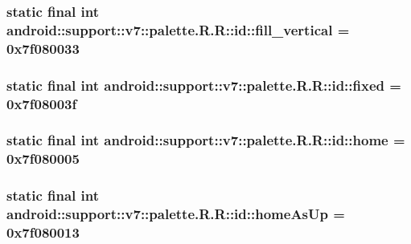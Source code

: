\hypertarget{classandroid_1_1support_1_1v7_1_1palette_1_1_r_1_1id_1f8a043844a286ef240eb2be2ba0c433}{
\subsubsection[{fill\_\-vertical}]{\setlength{\rightskip}{0pt plus 5cm}static final int android::support::v7::palette.R.R::id::fill\_\-vertical = 0x7f080033}}
\label{classandroid_1_1support_1_1v7_1_1palette_1_1_r_1_1id_1f8a043844a286ef240eb2be2ba0c433}


\hypertarget{classandroid_1_1support_1_1v7_1_1palette_1_1_r_1_1id_488c2ac4cc4405d8818c4155389b869a}{
\subsubsection[{fixed}]{\setlength{\rightskip}{0pt plus 5cm}static final int android::support::v7::palette.R.R::id::fixed = 0x7f08003f}}
\label{classandroid_1_1support_1_1v7_1_1palette_1_1_r_1_1id_488c2ac4cc4405d8818c4155389b869a}


\hypertarget{classandroid_1_1support_1_1v7_1_1palette_1_1_r_1_1id_c0adc1b664d54781e62da911f71fe1f4}{
\subsubsection[{home}]{\setlength{\rightskip}{0pt plus 5cm}static final int android::support::v7::palette.R.R::id::home = 0x7f080005}}
\label{classandroid_1_1support_1_1v7_1_1palette_1_1_r_1_1id_c0adc1b664d54781e62da911f71fe1f4}


\hypertarget{classandroid_1_1support_1_1v7_1_1palette_1_1_r_1_1id_ef5b9b1f23963786d879ecdb93516bba}{
\subsubsection[{homeAsUp}]{\setlength{\rightskip}{0pt plus 5cm}static final int android::support::v7::palette.R.R::id::homeAsUp = 0x7f080013}}
\label{classandroid_1_1support_1_1v7_1_1palette_1_1_r_1_1id_ef5b9b1f23963786d879ecdb93516bba}



